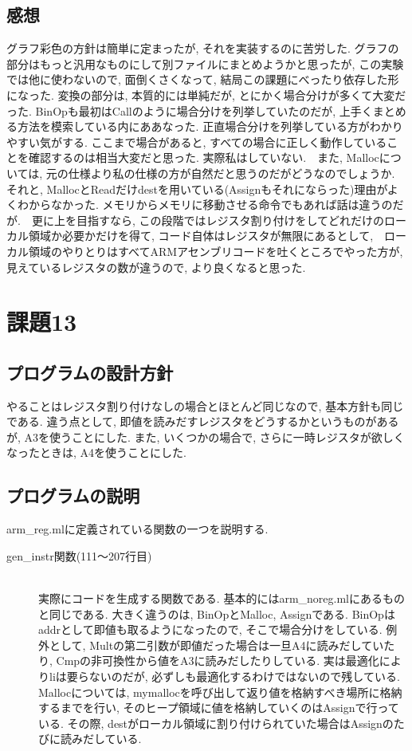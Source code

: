 \documentclass{jarticle}
\begin{document}
\subsection{感想}
グラフ彩色の方針は簡単に定まったが, それを実装するのに苦労した. グラフの部分はもっと汎用なものにして別ファイルにまとめようかと思ったが, この実験では他に使わないので, 面倒くさくなって, 結局この課題にべったり依存した形になった. 変換の部分は, 本質的には単純だが, とにかく場合分けが多くて大変だった. BinOpも最初はCallのように場合分けを列挙していたのだが, 上手くまとめる方法を模索している内にああなった. 正直場合分けを列挙している方がわかりやすい気がする. ここまで場合があると, すべての場合に正しく動作していることを確認するのは相当大変だと思った. 実際私はしていない.　また, Mallocについては, 元の仕様より私の仕様の方が自然だと思うのだがどうなのでしょうか. それと, MallocとReadだけdestを用いている(Assignもそれにならった)理由がよくわからなかった. メモリからメモリに移動させる命令でもあれば話は違うのだが.　更に上を目指すなら, この段階ではレジスタ割り付けをしてどれだけのローカル領域か必要かだけを得て, コード自体はレジスタが無限にあるとして,　ローカル領域のやりとりはすべてARMアセンブリコードを吐くところでやった方が, 見えているレジスタの数が違うので, より良くなると思った.


\section{課題13}
\subsection{プログラムの設計方針}
やることはレジスタ割り付けなしの場合とほとんど同じなので, 基本方針も同じである. 違う点として, 即値を読みだすレジスタをどうするかというものがあるが, A3を使うことにした. また, いくつかの場合で, さらに一時レジスタが欲しくなったときは, A4を使うことにした.
\subsection{プログラムの説明}
arm\_reg.mlに定義されている関数の一つを説明する.
\begin{description}
\item[gen\_instr関数(111〜207行目)] \leavevmode \\
実際にコードを生成する関数である. 基本的にはarm\_noreg.mlにあるものと同じである. 大きく違うのは, BinOpとMalloc, Assignである. BinOpはaddrとして即値も取るようになったので, そこで場合分けをしている. 例外として, Multの第二引数が即値だった場合は一旦A4に読みだしていたり, Cmpの非可換性から値をA3に読みだしたりしている. 実は最適化によりliは要らないのだが, 必ずしも最適化するわけではないので残している. Mallocについては, mymallocを呼び出して返り値を格納すべき場所に格納するまでを行い, そのヒープ領域に値を格納していくのはAssignで行っている. その際, destがローカル領域に割り付けられていた場合はAssignのたびに読みだしている.
\end{description}
\end{document}

